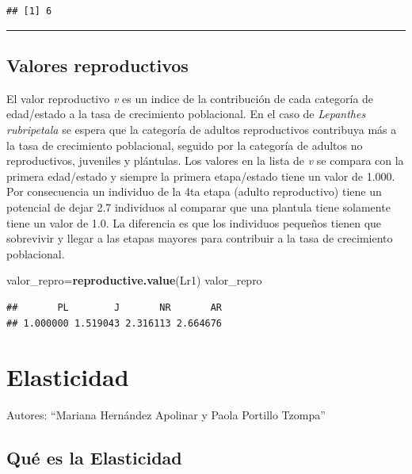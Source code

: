 \documentclass[
]{book}
\newenvironment{Shaded}{\begin{snugshade}}{\end{snugshade}}
\newcommand{\FunctionTok}[1]{\textcolor[rgb]{0.13,0.29,0.53}{\textbf{#1}}}
\newcommand{\NormalTok}[1]{#1}
\newcommand{\OtherTok}[1]{\textcolor[rgb]{0.56,0.35,0.01}{#1}}
\theoremstyle{definition}
\theoremstyle{definition}
\theoremstyle{definition}
\theoremstyle{definition}
\theoremstyle{remark}
\begin{document}
\begin{verbatim}
## [1] 6
\end{verbatim}

\begin{center}\rule{0.5\linewidth}{0.5pt}\end{center}

\section{Valores reproductivos}\label{valores-reproductivos}

El valor reproductivo \emph{v} es un indice de la contribución de cada categoría de edad/estado a la tasa de crecimiento poblacional. En el caso de \emph{Lepanthes rubripetala} se espera que la categoría de adultos reproductivos contribuya más a la tasa de crecimiento poblacional, seguido por la categoría de adultos no reproductivos, juveniles y plántulas. Los valores en la lista de \emph{v} se compara con la primera edad/estado y siempre la primera etapa/estado tiene un valor de 1.000. Por consecuencia un individuo de la 4ta etapa (adulto reproductivo) tiene un potencial de dejar 2.7 individuos al comparar que una plantula tiene solamente tiene un valor de 1.0. La diferencia es que los individuos pequeños tienen que sobrevivir y llegar a las etapas mayores para contribuir a la tasa de crecimiento poblacional.

\begin{Shaded}
\begin{Highlighting}[]
\NormalTok{valor\_repro}\OtherTok{=}\FunctionTok{reproductive.value}\NormalTok{(Lr1)}
\NormalTok{valor\_repro}
\end{Highlighting}
\end{Shaded}

\begin{verbatim}
##       PL        J       NR       AR 
## 1.000000 1.519043 2.316113 2.664676
\end{verbatim}

\chapter{Elasticidad}\label{elasticidad}

Autores: ``Mariana Hernández Apolinar y Paola Portillo Tzompa''

\section{Qué es la Elasticidad}\label{quuxe9-es-la-elasticidad}
\end{document}
